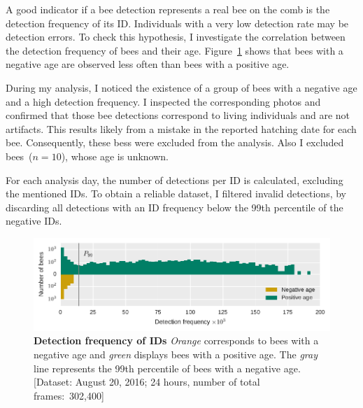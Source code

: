 A good indicator if a bee detection represents a real bee on the comb is the detection frequency of its ID.
Individuals with a very low detection rate may be detection errors.
To check this hypothesis, I investigate the correlation between the detection frequency of bees and their age.
Figure~\ref{fig:filter} shows that bees with a negative age are
observed less often than bees with a positive age.

During my analysis, I noticed the existence of a group of bees with a negative age and a high detection frequency.
I inspected the corresponding photos and confirmed that those bee detections correspond to living individuals and are not artifacts.
This results likely from a mistake in the reported hatching date for each bee.
Consequently, these bess were excluded from the analysis. Also I excluded bees~($n=10$), whose age is unknown.

For each analysis day, the number of detections per ID is calculated, excluding the mentioned IDs.
To obtain a reliable dataset, I filtered invalid detections, by discarding all detections with an ID frequency below the 99th percentile of the negative IDs.

\begin{figure}[htbp]
	\centering
	\includegraphics[width=1.0\textwidth]{Figures/filter}
	\caption[Detection frequency of IDs]{\textbf{Detection frequency of IDs} \emph{Orange} corresponds to bees with a negative age and \emph{green} displays bees with a positive age. The \emph{gray} line represents the 99th percentile of bees with a negative age. [Dataset: August 20, 2016; 24 hours, number of total frames:~302,400]}
	\label{fig:filter}
\end{figure}

